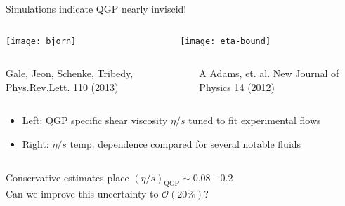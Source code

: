 \documentclass[svgnames]{beamer}
\begin{document}
\begin{frame}{Simulations indicate QGP nearly inviscid!}

 \begin{columns}
 \begin{column}{0.45\columnwidth}
 \centering
 \texttt{[image: bjorn]}
 \end{column}
 \begin{column}{0.55\columnwidth}
 \centering
 \vspace{0.05 in} \texttt{[image: eta-bound]}
 \end{column}
 \end{columns}
 
 \begin{columns}
 \begin{column}{0.45\columnwidth}
 \centering
 \tiny Gale, Jeon, Schenke, Tribedy, Phys.Rev.Lett. 110 (2013)
 \end{column}
 \begin{column}{0.55\columnwidth}
 \centering
 \tiny A Adams, et. al. New Journal of Physics 14 (2012)
 \end{column}
 \end{columns}
 
 \vspace{0.1 in}
 
\begin{itemize}
  \item Left: QGP specific shear viscosity $\eta/s$ tuned to fit experimental flows
  \item Right: $\eta/s$ temp. dependence compared for several notable fluids
\end{itemize}
\vspace{-0.2 in}
\begin{columns}
 \begin{column}{0.78\textwidth}
  \begin{block}{\vspace*{-3ex}}
  \centering 
    Conservative estimates place $(\eta/s)_\text{QGP} \sim 0.08$ - $0.2$ \\ 
    \vspace{0.05 in}
    Can we improve this uncertainty to $\mathcal{O}(20\%)$?
 \end{block}
 \end{column}

\end{columns}
\end{frame}
\end{document}
